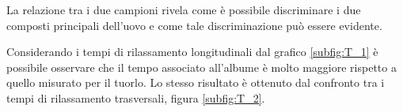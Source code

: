La relazione tra i due campioni rivela come è possibile discriminare i due composti principali dell'uovo e come tale discriminazione può essere evidente.

Considerando i tempi di rilassamento longitudinali dal grafico \ref{subfig:T_1} è possibile osservare che il tempo associato all'albume è molto maggiore rispetto a quello misurato per il tuorlo. 
Lo stesso risultato è ottenuto dal confronto tra i tempi di rilassamento trasversali, figura \ref{subfig:T_2}.

\begin{figure}[ht]
\centering
{} \quad
{} \\
\caption{}
\label{fig:Confronto}
\end{figure}

